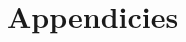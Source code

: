 \documentclass{report}[11pt]
\begin{document}

\clearpage
\tableofcontents
\clearpage


\clearpage
\appendix

\section*{Appendicies}

\clearpage
\printbibliography
\end{document}
